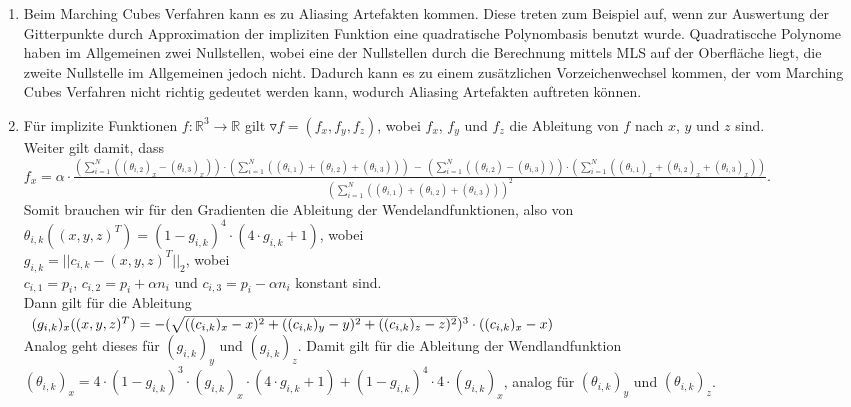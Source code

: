 \documentclass[a4paper,10pt]{scrartcl}
\begin{document}
\begin{enumerate}[1.]
\item Beim Marching Cubes Verfahren kann es zu Aliasing Artefakten kommen. Diese treten zum Beispiel auf, wenn zur Auswertung der Gitterpunkte durch Approximation der impliziten Funktion eine quadratische Polynombasis benutzt wurde. Quadratiscche Polynome haben im Allgemeinen zwei Nullstellen, wobei eine der Nullstellen durch die Berechnung mittels MLS auf der Oberfläche liegt, die zweite Nullstelle im Allgemeinen jedoch nicht. Dadurch kann es zu einem zusätzlichen Vorzeichenwechsel kommen, der vom Marching Cubes Verfahren nicht richtig gedeutet werden kann, wodurch Aliasing Artefakten auftreten können.

\item F\"ur implizite Funktionen $f: \mathbb R^3 \to \mathbb R$ gilt $\triangledown f = (f_x, f_y, f_z)$, wobei $f_x$, $f_y$ und $f_z$ die Ableitung von $f$ nach $x$, $y$ und $z$ sind.\\
Weiter gilt damit, dass \\
$f_x = \alpha \cdot \frac{(\sum_{i=1}^N ((\theta_{i,2})_x - (\theta_{i,3})_x)) \cdot (\sum_{i=1}^N ((\theta_{i,1}) + (\theta_{i,2}) + (\theta_{i,3}))) ~-~ (\sum_{i=1}^N ((\theta_{i,2}) - (\theta_{i,3}))) \cdot (\sum_{i=1}^N ((\theta_{i,1})_x + (\theta_{i,2})_x + (\theta_{i,3})_x))}
{(\sum_{i=1}^N ((\theta_{i,1}) + (\theta_{i,2}) + (\theta_{i,3})))^2}$.\\
Somit brauchen wir f\"ur den Gradienten die Ableitung der Wendelandfunktionen, also von \\
$\theta_{i,k} ((x,y,z)^T) = (1 - g_{i,k})^4 \cdot (4 \cdot g_{i,k} + 1)$, wobei \\
$g_{i,k} = ||c_{i,k} - (x,y,z)^T||_2$, wobei\\
$c_{i,1} = p_i$, $c_{i,2} = p_i + \alpha n_i$ und $c_{i,3} = p_i - \alpha n_i$ konstant sind.\\
Dann gilt f\"ur die Ableitung \\
$\begin{array}{r c l}
 (g_{i,k})_x ((x,y,z)^T) = - (\sqrt{((c_{i,k})_x - x)^2 + ((c_{i,k})_y - y)^2 + ((c_{i,k})_z - z)^2})^3 \cdot ((c_{i,k})_x - x) \\
\end{array}$\\
Analog geht dieses f\"ur $(g_{i,k})_y$ und $(g_{i,k})_z$. Damit gilt für die Ableitung der Wendlandfunktion \\
$(\theta_{i,k})_x = 4 \cdot (1 - g_{i,k})^3 \cdot (g_{i,k})_x \cdot (4 \cdot g_{i,k} + 1) + (1 - g_{i,k})^4 \cdot 4 \cdot (g_{i,k})_x$, analog für $(\theta_{i,k})_y$ und $(\theta_{i,k})_z$.


\end{enumerate}
\end{document}
